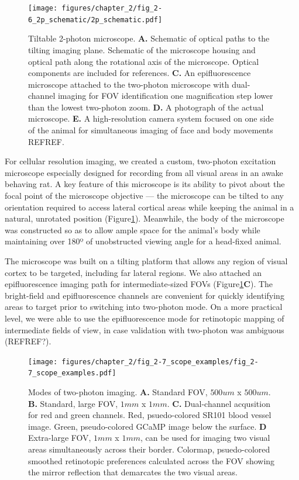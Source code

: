 \begin{figure}[t!]
    \texttt{[image: figures/chapter\_2/fig\_2-6\_2p\_schematic/2p\_schematic.pdf]}
    \vspace{.1in}
    \caption[Tilting two-photon microscope]{Tiltable 2-photon microscope. \textbf{A.} Schematic of optical paths to the tilting imaging plane.  Schematic of the microscope housing and optical path along the rotational axis of the microscope. Optical components are included for references. \textbf{C.} An epifluorescence microscope attached to the two-photon microscope with dual-channel imaging for FOV identification one magnification step lower than the lowest two-photon zoom. \textbf{D.} A photograph of the actual microscope. \textbf{E.} A high-resolution camera system focused on one side of the animal for simultaneous imaging of face and body movements REFREF.
    \label{fig:2p_schematic}}
\end{figure}

For cellular resolution imaging, we created a custom, two-photon excitation microscope especially designed for recording from all visual areas in an awake behaving rat. A key feature of this microscope is its ability to pivot about the focal point of the microscope objective --- the microscope can be tilted to any orientation required to access lateral cortical areas while keeping the animal in a natural, unrotated position (Figure\ref{fig:2p_schematic}). Meanwhile, the body of the microscope was constructed so as to allow ample space for the animal's body while maintaining over 180º of unobstructed viewing angle for a head-fixed animal.


The microscope was built on a tilting platform that allows any region of visual cortex to be targeted, including far lateral regions. We also attached an epifluorescence imaging path for intermediate-sized FOVs (Figure\ref{fig:2p_schematic}\textbf{C}). The bright-field and epifluorescence channels are convenient for quickly identifying areas to target prior to switching into two-photon mode. On a more practical level, we were able to use the epifluorescence mode for retinotopic mapping of intermediate fields of view, in case validation with two-photon was ambiguous (REFREF?). 

\begin{figure}[t!]
    \texttt{[image: figures/chapter\_2/fig\_2-7\_scope\_examples/fig\_2-7\_scope\_examples.pdf]}
    \vspace{.1in}
    \caption[Two-photon imaging modes]{Modes of two-photon imaging. \textbf{A.} Standard FOV, $500um$ x $500um$. \textbf{B.} Standard, large FOV, $1mm$ x $1mm$. \textbf{C.} Dual-channel acqusition for red and green channels. Red, psuedo-colored SR101 blood vessel image. Green, pseudo-colored GCaMP image below the surface. \textbf{D} Extra-large FOV, $1mm$ x $1mm$, can be used for imaging two visual areas simultaneously across their border. Colormap, psuedo-colored smoothed retinotopic preferences calculated across the FOV showing the mirror reflection that demarcates the two visual areas. 
    \label{fig:scope_examples}}
\end{figure}

